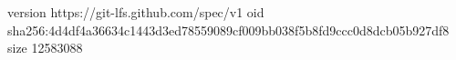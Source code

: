 version https://git-lfs.github.com/spec/v1
oid sha256:4d4df4a36634c1443d3ed78559089cf009bb038f5b8fd9ccc0d8dcb05b927df8
size 12583088
